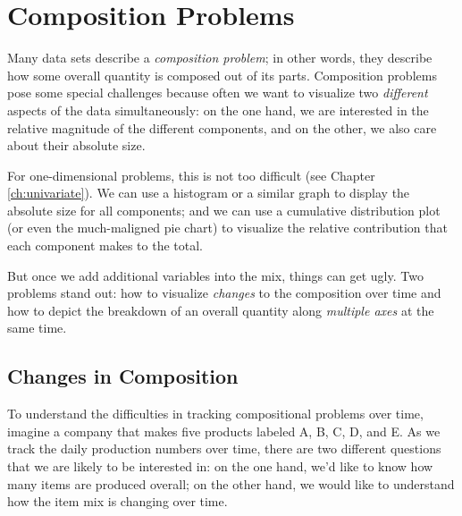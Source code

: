
\vspace*{-6pt}
\section{Composition Problems}


Many data sets describe a \emph{composition problem}; in other words,
they describe how some overall quantity is composed out of its parts.
Composition problems pose some special challenges because often we
want to visualize two \emph{different} aspects of the data
simultaneously: on the one hand, we are interested in the relative
magnitude of the different components, and on the other,  we also care
about their absolute size.

For one-dimensional problems, this is not too difficult (see Chapter
\ref{ch:univariate}). We can use a histogram or a similar graph to
display the absolute size for all components; and we can use a
cumulative distribution plot (or even the much-maligned pie chart) to
visualize the relative contribution that each component makes to the
total.

But once we add additional variables into the mix, things can get
ugly. Two problems stand out: how to visualize \emph{changes} to the
composition over time and how to depict the breakdown of an overall
quantity along \emph{multiple axes} at the same time.

\vspace*{-6pt}
\subsection{Changes in Composition}

To understand the difficulties in tracking compositional problems over
time, imagine a company that makes five products labeled A, B, C, D,
and E. As we track the daily production numbers over time, there are
two different questions that we are likely to be interested in: on the
one hand, we'd like to know how many items are produced overall; on
the other hand, we would like to understand how the item mix is
changing over time.

